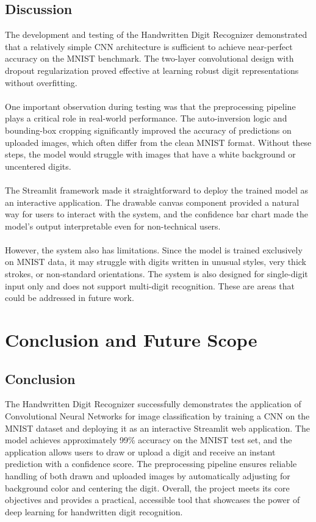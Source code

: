 \documentclass[12pt,a4paper]{report}
\begin{document}
\section{Discussion}
The development and testing of the Handwritten Digit Recognizer demonstrated that a relatively simple CNN architecture is sufficient to achieve near-perfect accuracy on the MNIST benchmark. The two-layer convolutional design with dropout regularization proved effective at learning robust digit representations without overfitting.\\ \\
One important observation during testing was that the preprocessing pipeline plays a critical role in real-world performance. The auto-inversion logic and bounding-box cropping significantly improved the accuracy of predictions on uploaded images, which often differ from the clean MNIST format. Without these steps, the model would struggle with images that have a white background or uncentered digits.\\ \\
The Streamlit framework made it straightforward to deploy the trained model as an interactive application. The drawable canvas component provided a natural way for users to interact with the system, and the confidence bar chart made the model's output interpretable even for non-technical users.\\ \\
However, the system also has limitations. Since the model is trained exclusively on MNIST data, it may struggle with digits written in unusual styles, very thick strokes, or non-standard orientations. The system is also designed for single-digit input only and does not support multi-digit recognition. These are areas that could be addressed in future work.

\chapter{Conclusion and Future Scope}
\section{Conclusion}
The Handwritten Digit Recognizer successfully demonstrates the application of Convolutional Neural Networks for image classification by training a CNN on the MNIST dataset and deploying it as an interactive Streamlit web application. The model achieves approximately 99\% accuracy on the MNIST test set, and the application allows users to draw or upload a digit and receive an instant prediction with a confidence score. The preprocessing pipeline ensures reliable handling of both drawn and uploaded images by automatically adjusting for background color and centering the digit. Overall, the project meets its core objectives and provides a practical, accessible tool that showcases the power of deep learning for handwritten digit recognition.
\end{document}
